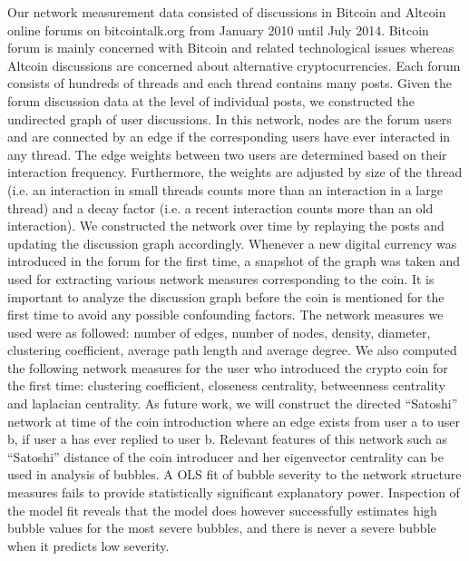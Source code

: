 Our network measurement data consisted of discussions in Bitcoin and Altcoin online forums on bitcointalk.org from January 2010 until July 2014. 
Bitcoin forum is mainly concerned with Bitcoin and related technological issues whereas Altcoin discussions are concerned about alternative cryptocurrencies. Each forum consists of hundreds of threads and each thread contains many posts.  Given the forum discussion data at the level of individual posts, we constructed the undirected graph of user discussions. In this network, nodes are the forum users and are connected by an edge if the corresponding users have ever interacted in any thread. The edge weights between two users are determined based on their interaction frequency. Furthermore, the weights are adjusted by size of the thread (i.e. an interaction in small threads counts more than an interaction in a large thread) and a decay factor (i.e. a recent interaction counts more than an old interaction). We constructed the network over time by replaying the posts and updating the discussion graph accordingly.  Whenever a new digital currency was introduced in the forum for the first time, a snapshot of the graph was taken and used for extracting various network measures corresponding to the coin. It is important to analyze the discussion graph before the coin is mentioned for the first time to avoid any possible confounding factors. The network measures we used were as followed: number of edges, number of nodes, density, diameter, clustering coefficient, average path length and average degree. We also computed the following network measures for the user who introduced the crypto coin for the first time: clustering coefficient, closeness centrality, betweenness centrality and laplacian centrality. As future work, we will construct the directed “Satoshi” network at time of the coin introduction where an edge exists from user a to user b, if user a has ever replied to user b. Relevant features of this network such as “Satoshi” distance of the coin introducer and her eigenvector centrality can be used in analysis of bubbles.
A OLS fit of bubble severity to the network structure measures fails to provide statistically significant explanatory power. Inspection of the model fit reveals that the model does however successfully estimates high bubble values for the most severe bubbles, and there is never a severe bubble when it predicts low severity.








